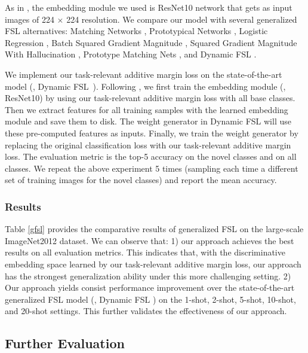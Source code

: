 \documentclass[10pt,twocolumn,letterpaper]{article}
\begin{document}
As in \cite{Gidaris2018cvpr}, the embedding module we used is ResNet10 network that gets as input images of 224 $\times$ 224 resolution. We compare our model with several generalized FSL alternatives: Matching Networks \cite{vinyals2016bnips}, Prototypical Networks \cite{Snell2017nips}, Logistic Regression \cite{Wang2018cvprlsl}, Batch Squared Gradient Magnitude \cite{Hariharan2017iccv}, Squared Gradient Magnitude With Hallucination \cite{Hariharan2017iccv}, Prototype Matching Nets \cite{Wang2018cvprlsl}, and Dynamic FSL \cite{Gidaris2018cvpr}. 

We implement our task-relevant additive margin loss on the state-of-the-art model (\ie, Dynamic FSL~\cite{Gidaris2018cvpr}). Following \cite{Wang2018cvprlsl}, we first train the embedding module (\ie, ResNet10) by using our task-relevant additive margin loss with all base classes. Then we extract features for all training samples with the learned embedding module and save them to disk. The weight generator in Dynamic FSL \cite{Gidaris2018cvpr} will use these pre-computed features as inputs. Finally, we train the weight generator by replacing the original classification loss with our task-relevant additive margin loss. The evaluation metric is the top-5 accuracy on the novel classes and on all classes. We repeat the above experiment 5 times (sampling each time a different set of training images for the novel classes) and report the mean accuracy.

\subsubsection{Results}

Table \ref{gfsl} provides the comparative results of generalized FSL on the large-scale ImageNet2012 dataset. We can observe that: 1) our approach achieves the best results on all evaluation metrics. This indicates that, with the discriminative embedding space learned by our task-relevant additive margin loss, our approach has the strongest generalization ability under this more challenging setting. 2) Our approach yields consist performance improvement over the state-of-the-art generalized FSL model (\ie, Dynamic FSL \cite{Gidaris2018cvpr}) on the 1-shot, 2-shot, 5-shot, 10-shot, and 20-shot settings. This further validates the effectiveness of our approach. 

\subsection{Further Evaluation}
\end{document}
